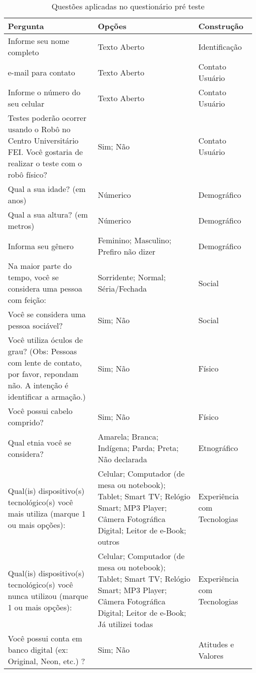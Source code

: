 \begin{longtable}{ m{7 cm} | m{4cm} | m{4cm} }
	\caption{Questões aplicadas no questionário pré teste }
	\label{tab:questoespreteste} \\	\hline
	Pergunta & Opções & Construção \\ \hline
	Informe seu nome completo & Texto Aberto & Identificação \\ \hline
	e-mail para contato & Texto Aberto & Contato Usuário \\ \hline
	Informe o número do seu celular & Texto Aberto & Contato Usuário \\ \hline
	Testes poderão ocorrer usando o Robô no Centro Universitário FEI. Você gostaria de realizar o teste com o robô físico? & Sim; Não & Contato Usuário \\ \hline
	Qual a sua idade? (em anos) & Númerico & Demográfico \\ \hline
	Qual a sua altura? (em metros) & Númerico & Demográfico \\ \hline
	Informa seu gênero & Feminino; Masculino; Prefiro não dizer & Demográfico \\ \hline
	Na maior parte do tempo, você se considera uma pessoa com feição: & Sorridente; Normal; Séria/Fechada & Social \\ \hline
	Você se considera uma pessoa sociável? & Sim; Não & Social \\ \hline
	Você utiliza óculos de grau? (Obs: Pessoas com lente de contato, por favor, repondam não. A intenção é identificar a armação.) & Sim; Não & Físico \\ \hline
	Você possui cabelo comprido? & Sim; Não & Físico \\ \hline
	Qual etnia você se considera? & Amarela; Branca; Indígena; Parda; Preta; Não declarada & Etnográfico \\ \hline
	Qual(is) dispositivo(s) tecnológico(s) você mais utiliza (marque 1 ou mais opções): & Celular; Computador (de mesa ou notebook); Tablet; Smart TV; Relógio Smart; MP3 Player; Câmera Fotográfica Digital; Leitor de e-Book; outros & Experiência com Tecnologias \\ \hline
	Qual(is) dispositivo(s) tecnológico(s) você nunca utilizou (marque 1 ou mais opções): & Celular; Computador (de mesa ou notebook); Tablet; Smart TV; Relógio Smart; MP3 Player; Câmera Fotográfica Digital; Leitor de e-Book; Já utilizei todas & Experiência com Tecnologias \\ \hline
	Você possui conta em banco digital (ex: Original, Neon, etc.) ? & Sim; Não & Atitudes e Valores \\ \hline

\end{longtable}
